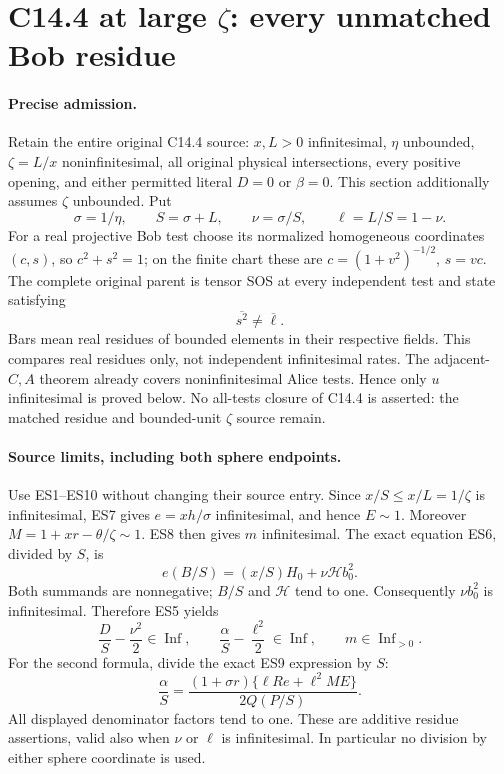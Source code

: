 \section{C14.4 at large $\zeta$: every unmatched Bob residue}
\label{sec:r18-c144-bob-residue}

\paragraph{Precise admission.}
Retain the entire original C14.4 source: $x,L>0$ infinitesimal,
$\eta$ unbounded, $\zeta=L/x$ noninfinitesimal, all original physical
intersections, every positive opening, and either permitted literal
$D=0$ or $\beta=0$. This section additionally assumes $\zeta$
unbounded. Put
\[
 \sigma=1/\eta,\qquad S=\sigma+L,\qquad
 \nu=\sigma/S,\qquad \ell=L/S=1-\nu.
\]
For a real projective Bob test choose its normalized homogeneous
coordinates $(c,s)$, so $c^2+s^2=1$; on the finite chart these are
$c=(1+v^2)^{-1/2}$, $s=vc$. The complete original parent is tensor SOS
at every independent test and state satisfying
\[
                         \overline{s^2}\ne\overline\ell.       \tag{EB1}
\]
Bars mean real residues of bounded elements in their respective fields.
This compares real residues only, not independent infinitesimal rates.
The adjacent-$C,A$ theorem already covers noninfinitesimal Alice
tests. Hence only $u$ infinitesimal is proved below. No all-tests
closure of C14.4 is asserted: the matched residue and bounded-unit
$\zeta$ source remain.

\paragraph{Source limits, including both sphere endpoints.}
Use ES1--ES10 without changing their source entry. Since
$x/S\le x/L=1/\zeta$ is infinitesimal, ES7 gives
$e=xh/\sigma$ infinitesimal, and hence $E\sim1$.
Moreover $M=1+xr-\theta/\zeta\sim1$. ES8 then gives $m$ infinitesimal.
The exact equation ES6, divided by $S$, is
\[
 e(B/S)=(x/S)H_0+\nu\mathcal H b_0^2.
\]
Both summands are nonnegative; $B/S$ and $\mathcal H$ tend to one.
Consequently $\nu b_0^2$ is infinitesimal. Therefore ES5 yields
\[
 \frac DS-\frac{\nu^2}{2}\in\operatorname{Inf},\qquad
 \frac\alpha S-\frac{\ell^2}{2}\in\operatorname{Inf},
 \qquad m\in\operatorname{Inf}_{>0}.                         \tag{EB2}
\]
For the second formula, divide the exact ES9 expression by $S$:
\[
 \frac\alpha S=
 \frac{(1+\sigma r)\{\ell R e+\ell^2ME\}}
 {2Q(P/S)}.
\]
All displayed denominator factors tend to one. These are additive
residue assertions, valid also when $\nu$ or $\ell$ is infinitesimal.
In particular no division by either sphere coordinate is used.

